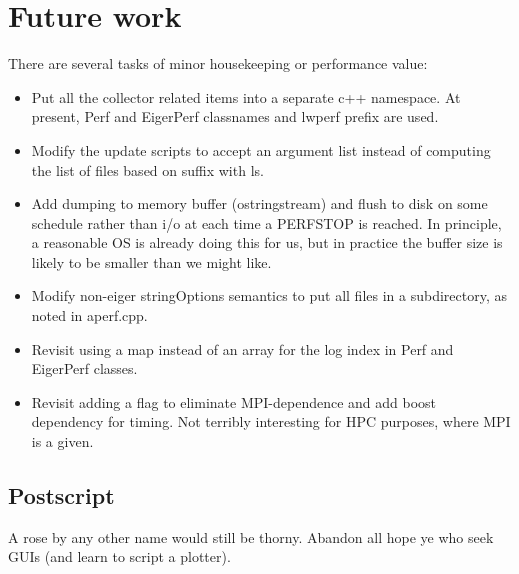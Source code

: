 
\chapter{Future work}\label{sec:future}
There are several tasks of minor housekeeping or performance value:
\begin{itemize}

\item Put all the collector related items into a separate c++ namespace. At present, Perf and EigerPerf classnames and lwperf prefix are used.

\item Modify the update scripts to accept an argument list instead of computing
the list of files based on suffix with ls.

\item Add dumping to memory buffer (ostringstream) and flush to disk on some schedule rather than i/o at each time a PERFSTOP is reached. In principle, a reasonable OS is already doing this for us, but in practice the buffer size is likely to be smaller than we might like.

\item Modify non-eiger stringOptions semantics to put all files in a subdirectory, as noted in aperf.cpp.

\item Revisit using a map instead of an array for the log index in Perf and EigerPerf classes.

\item Revisit adding a flag to eliminate MPI-dependence and add boost dependency for timing. Not terribly interesting for HPC purposes, where MPI is a given.
\end{itemize}

\section{Postscript}

A rose by any other name would still be thorny. Abandon all hope ye who seek GUIs (and learn to script a plotter).


